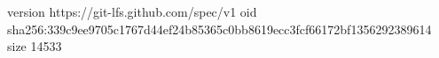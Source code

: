 version https://git-lfs.github.com/spec/v1
oid sha256:339c9ee9705c1767d44ef24b85365c0bb8619ecc3fcf66172bf1356292389614
size 14533
